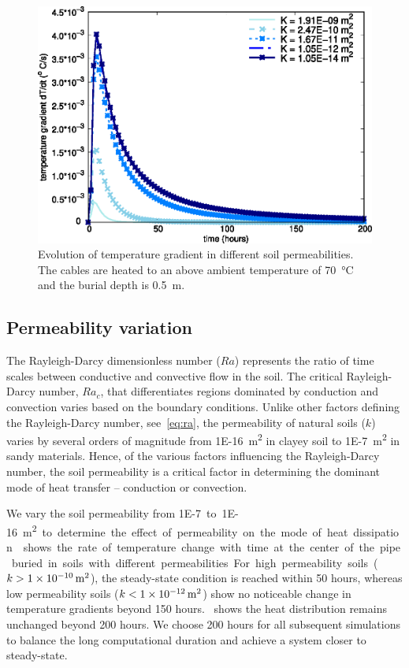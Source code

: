 \documentclass[Journal,letterpaper,InsideFigs]{ascelike-new}
\begin{document}
\begin{figure}
    \centering
    \includegraphics{figs/dTdt.eps}
    \caption{Evolution of temperature gradient in different soil permeabilities. The cables are heated to an above ambient temperature of \SI{70}{\celsius} and the burial depth is \SI{0.5}{\meter}.}
    \label{fig:dTdt}
\end{figure}

\subsection*{Permeability variation}
The Rayleigh-Darcy dimensionless number ($Ra$) represents the ratio of time scales between conductive and convective flow in the soil. The critical Rayleigh-Darcy number, $Ra_c$, that differentiates regions dominated by conduction and convection varies based on the boundary conditions. Unlike other factors defining the Rayleigh-Darcy number, see~\cref{eq:ra}, the permeability of natural soils ($k$) varies by several orders of magnitude from \SI{1E-16}{\meter\squared} in clayey soil to \SI{1E-7}{\meter\squared} in sandy materials. Hence, of the various factors influencing the Rayleigh-Darcy number, the soil permeability is a critical factor in determining the dominant mode of heat transfer -- conduction or convection.

We vary the soil permeability from \SI{1E-7} to \SI{1E-16}{\meter\squared} to determine the effect of permeability on the mode of heat dissipation.~ shows the rate of temperature change with time at the center of the pipe buried in soils with different permeabilities. For high permeability soils ($k > \SI{1E-10}{\meter\squared}$), the steady-state condition is reached within 50 hours, whereas low permeability soils ($k < \SI{1E-12}{\meter\squared}$) show no noticeable change in temperature gradients beyond 150 hours.~ shows the heat distribution remains unchanged beyond 200 hours. We choose 200 hours for all subsequent simulations to balance the long computational duration and achieve a system closer to steady-state. 
\end{document}
